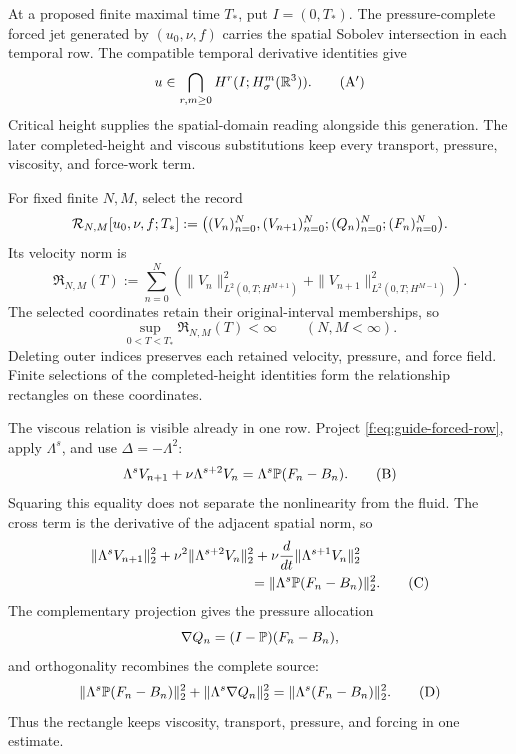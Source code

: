\label{f:guide:intersection}
At a proposed finite maximal time \(T_*\), put \(I=(0,T_*)\).
The pressure-complete forced jet generated by \((u_0,\nu,f)\) carries the
spatial Sobolev intersection in each temporal row. The compatible temporal
derivative identities give
\[
 u\in\bigcap_{r,m\ge0}H^r(I;H^m_\sigma(\mathbb R^3)).
 \tag{A$'$}
\]
Critical height supplies the spatial-domain reading alongside this
generation. The later completed-height and viscous substitutions keep every
transport, pressure, viscosity, and force-work term.

For fixed finite \(N,M\), select the record
\[
 \mathcal R_{N,M}[u_0,\nu,f;T_*]
 :=\bigl((V_n)_{n=0}^{N},(V_{n+1})_{n=0}^{N};
         (Q_n)_{n=0}^{N};(F_n)_{n=0}^{N}\bigr).
\]
Its velocity norm is
\[
 \mathfrak R_{N,M}(T)
 :=\sum_{n=0}^{N}\left(
 \|V_n\|_{L^2(0,T;H^{M+1})}^2
 +\|V_{n+1}\|_{L^2(0,T;H^{M-1})}^2\right).
\]
The selected coordinates retain their original-interval memberships, so
\[
 \sup_{0<T<T_*}\mathfrak R_{N,M}(T)<\infty
 \qquad(N,M<\infty).
 \tag{A}
\]
Deleting outer indices preserves each retained velocity, pressure, and force
field. Finite selections of the completed-height identities form the
relationship rectangles on these coordinates.

The viscous relation is visible already in one row.  Project
\eqref{f:eq:guide-forced-row}, apply \(\Lambda^s\), and use
\(\Delta=-\Lambda^2\):
\[
 \Lambda^sV_{n+1}+\nu\Lambda^{s+2}V_n
 =\Lambda^s\mathbb P(F_n-B_n).
 \tag{B}
\]
Squaring this equality does not separate the nonlinearity from the fluid.
The cross term is the derivative of the adjacent spatial norm, so
\begin{align}
 &\|\Lambda^sV_{n+1}\|_2^2
 +\nu^2\|\Lambda^{s+2}V_n\|_2^2
 +\nu\frac{d}{dt}\|\Lambda^{s+1}V_n\|_2^2
 \notag\\
 &\hspace{4cm}
 =\|\Lambda^s\Pp(F_n-B_n)\|_2^2.
 \tag{C}
\end{align}
The complementary projection gives the pressure allocation
\[
 \nabla Q_n=(I-\mathbb P)(F_n-B_n),
\]
and orthogonality recombines the complete source:
\[
 \|\Lambda^s\mathbb P(F_n-B_n)\|_2^2
 +\|\Lambda^s\nabla Q_n\|_2^2
 =\|\Lambda^s(F_n-B_n)\|_2^2.
 \tag{D}
\]
Thus the rectangle keeps viscosity, transport, pressure, and forcing in one estimate.

